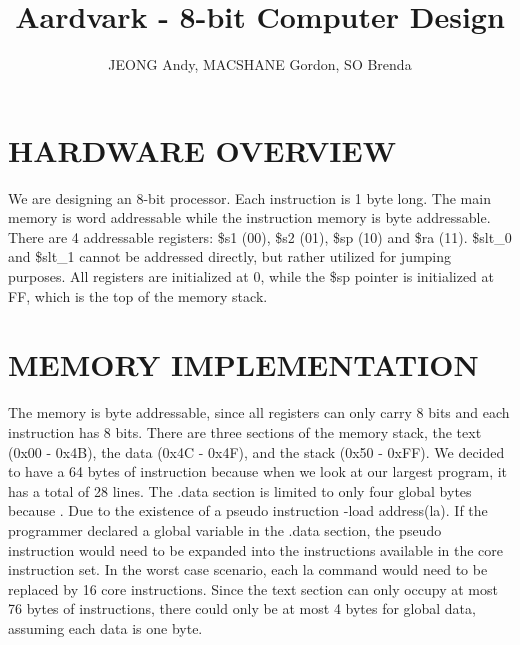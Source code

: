 \documentclass[11pt, titlepage]{article}
\author{JEONG Andy, MACSHANE Gordon, SO Brenda}
\title{Aardvark - 8-bit Computer Design}
\date{\parbox{\linewidth}{}}
\begin{document}
\maketitle
\tableofcontents
\newpage
\setcounter{tocdepth}{1}	
\section{HARDWARE OVERVIEW}
We are designing an 8-bit processor. Each instruction is 1 byte long. The main memory is word addressable while the instruction memory is byte addressable. There are 4 addressable registers: \$s1 (00), \$s2 (01), \$sp (10) and \$ra (11). \$slt\_0 and \$slt\_1 cannot be addressed directly, but rather utilized for jumping purposes. All registers are initialized at 0, while the \$sp pointer is initialized at FF, which is the top of the memory stack. 

\section{MEMORY IMPLEMENTATION}
The memory is byte addressable, since all registers can only carry 8 bits and each instruction has 8 bits. There are three sections of the memory stack, the text (0x00 - 0x4B), the data (0x4C - 0x4F), and the stack (0x50 - 0xFF). We decided to have a 64 bytes of instruction because when we look at our largest program, it has a total of 28 lines. The .data section is limited to only four global bytes because . Due to the existence of a pseudo instruction -load address(la). If the programmer declared a global variable in the .data section, the pseudo instruction would need to be expanded into the instructions available in the core instruction set. In the worst case scenario, each la command would need to be replaced by 16 core instructions. Since the text section can only occupy at most 76 bytes of instructions, there could only be at most 4 bytes for global data, assuming each data is one byte. 
\end{document}
